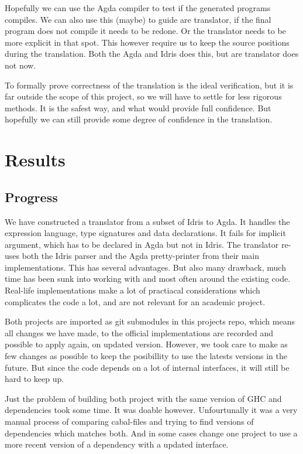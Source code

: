 \documentclass[parskip=half]{scrartcl}
\begin{document}
Hopefully we can use the Agda compiler to test if the generated programs
compiles. We can also use this (maybe) to guide are translator, if the final
program does not compile it needs to be redone. Or the translator needs to be
more explicit in that spot. This however require us to keep the source
positions during the translation. Both the Agda and Idris does this, but are
translator does not now.

To formally prove correctness of the translation is the ideal verification, but
it is far outside the scope of this project, so we will have to settle for less
rigorous methods. It is the safest way, and what would provide full confidence.
But hopefully we can still provide some degree of confidence in the
translation.


\section{Results}
\subsection{Progress}

We have constructed a translator from a subset of Idris to Agda. It handles the
expression language, type signatures and data declarations.  It fails for
implicit argument, which has to be declared in Agda but not in Idris. The
translator re-uses both the Idris parser and the Agda pretty-printer from their
main implementations. This has several advantages. But also many drawback, much
time has been sunk into working with and most often around the existing code.
Real-life implementations make a lot of practiacal considerations which
complicates the code a lot, and are not relevant for an academic project.

Both projects are imported as git submodules in this projects repo, which means
all changes we have made, to the official implementations are recorded and
possible to apply again, on updated version. However, we took care to make as
few changes as possible to keep the posibillity to use the latests versions in
the future. But since the code depends on a lot of internal interfaces, it will
still be hard to keep up.

Just the problem of building both project with the same version of GHC and
dependencies took some time. It was doable however. Unfourtunally it was a very
manual process of comparing cabal-files and trying to find versions of
dependencies which matches both. And in some cases change one project to use
a more recent version of a dependency with a updated interface.
\end{document}
